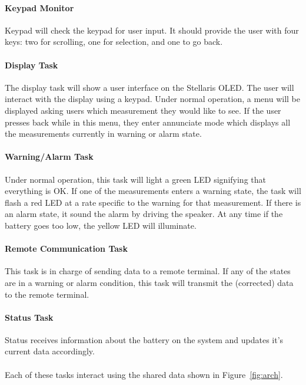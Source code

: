 \documentclass[12pt]{article} %
\begin{document}
    \paragraph{Keypad Monitor} Keypad will check the keypad for user input. It
    should provide the user with four keys: two for scrolling, one for selection,
    and one to go back.

    \paragraph{Display Task} The display task will show a user interface on the
    Stellaris OLED. The user will interact with the display using a keypad. Under
    normal operation, a menu will be displayed asking users which measurement they
    would like to see. If the user presses back while in this menu, they enter
    annunciate mode which displays all the measurements currently in warning or
    alarm state.

    \paragraph{Warning/Alarm Task} Under normal operation, this task will light a
    green LED signifying that everything is OK. If one of the measurements enters
    a warning state, the task will flash a red LED at a rate specific to the
    warning for that measurement. If there is an alarm state, it sound the alarm
    by driving the speaker. At any time if the battery goes too low, the yellow
    LED will illuminate.

    \paragraph{Remote Communication Task} This task is in charge of sending data to
    a remote terminal. If any of the states are in a warning or alarm condition,
    this task will transmit the (corrected) data to the remote terminal.

    \paragraph{Status Task} Status receives information about the battery on the
    system and updates it's current data accordingly.
    \\\\
    Each of these tasks interact using the shared data shown in Figure~\ref{fig:arch}. 
\end{document}
